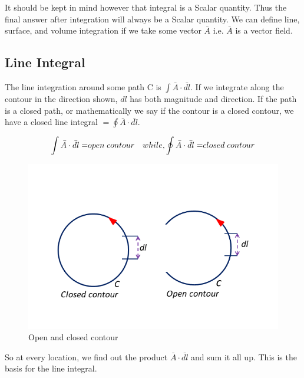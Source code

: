 It should be kept in mind however that integral is a Scalar quantity. Thus the final answer after integration will always be a Scalar quantity. We can define line, surface, and volume integration if we take some vector $\bar{A}$ i.e. $\bar{A}$ is a vector field. 

\subsection{Line Integral}
The line integration around some path C is ${\displaystyle \int  \bar{A} \cdot \bar{dl}}$. If we integrate along the contour in the direction shown, $dl$ has both magnitude and direction. If the path is a closed path, or mathematically we say if the contour is a closed contour, we have a closed line integral $= {\displaystyle \oint  \bar{A} \cdot \bar{dl}}$.

\begin{equation}
{\displaystyle \int  \bar{A} \cdot \bar{dl} = }open\; contour\quad while, \newline  {\displaystyle \oint  \bar{A} \cdot \bar{dl}= }closed\; contour
\end{equation}
\begin{figure}
\centering
\includegraphics[width=0.9\linewidth]{graphics/fig17.4}
\caption{Open and closed contour}
\end{figure}

So at every location, we find out the product $\bar{A} \cdot \bar{dl}$ and sum it all up. This is the basis for the line integral.
